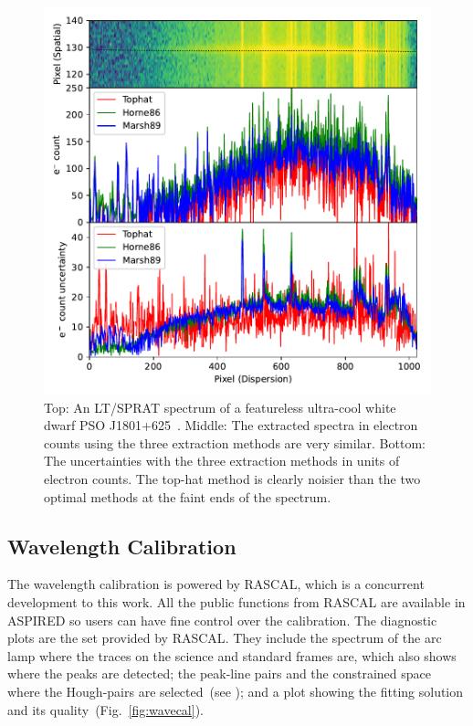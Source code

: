 \documentclass[twocolumn, linenumbers]{aastex631}
\begin{document}
\begin{figure}
    \centering
    \includegraphics[width=\columnwidth]{fig_04_extraction_compared.pdf}
    \caption{Top: An LT/SPRAT spectrum of a featureless ultra-cool white dwarf PSO J1801+625~\citep{2020MNRAS.493.6001L}.
    Middle: The extracted spectra in electron counts using the three extraction methods
    are very similar. Bottom: The uncertainties with the three extraction methods
    in units of electron counts. The
    top-hat method is clearly noisier than the two optimal methods at the faint ends of the spectrum.}
    \label{fig:extraction_compared}
\end{figure}

\subsection{Wavelength Calibration}
The wavelength calibration is powered by \textsc{RASCAL}, which
is a concurrent development to this work. All the public
functions from \textsc{RASCAL} are available in \textsc{ASPIRED}
so users can have fine control over the calibration. The
diagnostic plots are the set provided by \textsc{RASCAL}.
They include the spectrum of the arc lamp where the traces
on the science and standard frames are, which also shows where
the peaks are detected; the peak-line pairs and the constrained
space where the Hough-pairs are
selected~(see \citealt{2020ASPC..527..627V}); and a plot showing
the fitting solution and its quality~(Fig.~\ref{fig:wavecal}).
\end{document}
